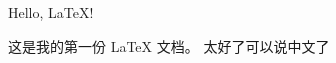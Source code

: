 \documentclass[UTF8]{ctexart}
\begin{document}
Hello, LaTeX!

这是我的第一份 LaTeX 文档。
太好了可以说中文了
\end{document}
